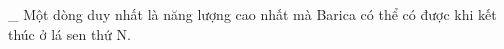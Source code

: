 \_ Một dòng duy nhất là năng lượng cao nhất mà Barica có thể có được khi kết thúc ở lá sen thứ N.  

\